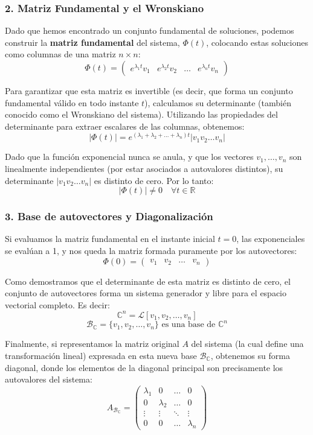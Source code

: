 \subsubsection*{2. Matriz Fundamental y el Wronskiano}

Dado que hemos encontrado un conjunto fundamental de soluciones, podemos construir la \textbf{matriz fundamental} del sistema, $\Phi(t)$, colocando estas soluciones como columnas de una matriz $n \times n$:
\[
    \Phi(t) = \begin{pmatrix} e^{\lambda_1 t} v_1 & e^{\lambda_2 t} v_2 & \dots & e^{\lambda_n t} v_n \end{pmatrix}
\]

Para garantizar que esta matriz es invertible (es decir, que forma un conjunto fundamental válido en todo instante $t$), calculamos su determinante (también conocido como el Wronskiano del sistema). Utilizando las propiedades del determinante para extraer escalares de las columnas, obtenemos:
\[
    |\Phi(t)| = e^{(\lambda_1 + \lambda_2 + \dots + \lambda_n) t} |v_1 v_2 \dots v_n|
\]

Dado que la función exponencial nunca se anula, y que los vectores $v_1, \dots, v_n$ son linealmente independientes (por estar asociados a autovalores distintos), su determinante $|v_1 v_2 \dots v_n|$ es distinto de cero. Por lo tanto:
\[
    |\Phi(t)| \neq 0 \quad \forall t \in \mathbb{R}
\]

\subsubsection*{3. Base de autovectores y Diagonalización}

Si evaluamos la matriz fundamental en el instante inicial $t = 0$, las exponenciales se evalúan a 1, y nos queda la matriz formada puramente por los autovectores:
\[
    \Phi(0) = \begin{pmatrix} v_1 & v_2 & \dots & v_n \end{pmatrix}
\]

Como demostramos que el determinante de esta matriz es distinto de cero, el conjunto de autovectores forma un sistema generador y libre para el espacio vectorial completo. Es decir:
\[
    \mathbb{C}^n = \mathcal{L} [v_1, v_2, \dots, v_n]
\]
\[
    \mathcal{B}_{\mathbb{C}} = \{v_1, v_2, \dots, v_n\} \text{ es una base de } \mathbb{C}^n
\]

Finalmente, si representamos la matriz original $A$ del sistema (la cual define una transformación lineal) expresada en esta nueva base $\mathcal{B}_{\mathbb{C}}$, obtenemos su forma diagonal, donde los elementos de la diagonal principal son precisamente los autovalores del sistema:
\[
    A_{\mathcal{B}_{\mathbb{C}}} = \begin{pmatrix} 
    \lambda_1 & 0 & \dots & 0 \\ 
    0 & \lambda_2 & \dots & 0 \\ 
    \vdots & \vdots & \ddots & \vdots \\ 
    0 & 0 & \dots & \lambda_n 
    \end{pmatrix}
\]

